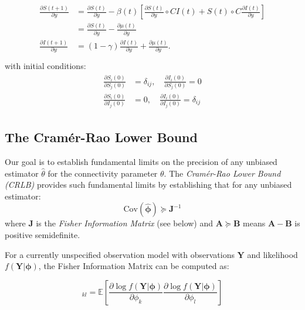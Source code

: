 \begin{align}\begin{split}
  \frac{\partial S(t+1)}{\partial y} &= \frac{\partial S(t)}{\partial
  y} - \beta(t) \left[ \frac{\partial S(t)}{\partial y} \circ CI(t) +
  S(t)\circ C \frac{\partial I(t)}{\partial y} \right] \\
  & = \frac{\partial S(t)}{\partial y} - \frac{\partial \mu(t)}{\partial y} \\
  \frac{\partial I(t+1)}{\partial y} &= (1-\gamma) \frac{\partial
  I(t)}{\partial y} + \frac{\partial \mu(t)}{\partial y}.\\
\end{split}\end{align}        
with initial conditions:
\begin{align}\begin{split}
\frac{\partial S_i(0)}{\partial S_j(0)} &= \delta_{ij}, \quad \frac{\partial I_i(0)}{\partial S_j(0)} = 0 \\
%
%
%
\frac{\partial S_i(0)}{\partial I_j(0)} &= 0, \quad \frac{\partial I_i(0)}{\partial I_j(0)} = \delta_{ij}
\end{split}\end{align}



\subsection{The Cram\'er-Rao Lower Bound}
Our goal is to establish fundamental limits on the precision of any
unbiased estimator $\hat{\theta}$ for the connectivity parameter
$\theta$. The \emph{Cram\'er-Rao Lower Bound (CRLB)} provides such
fundamental limits by establishing that for any unbiased estimator:
\begin{equation}
\text{Cov}(\hat{\boldsymbol{\phi}}) \succeq \mathbf{J}^{-1}
\end{equation}
where $\mathbf{J}$ is the \emph{Fisher Information Matrix} (see below)
and $\mathbf{A} \succeq \mathbf{B}$ means $\mathbf{A} - \mathbf{B}$ is
positive semidefinite.

For a currently unspecified observation model with observations
$\mathbf{Y}$ and likelihood $f(\mathbf{Y}|\boldsymbol{\phi})$, the
Fisher Information Matrix can be computed as:

\begin{equation}
  [\mathbf{J}]_{kl} 
  = \mathbb{E}\left[\frac{\partial \log
      f(\mathbf{Y}|\boldsymbol{\phi})}{\partial \phi_k}\frac{\partial
      \log f(\mathbf{Y}|\boldsymbol{\phi})}{\partial \phi_l}\right]
\end{equation}

